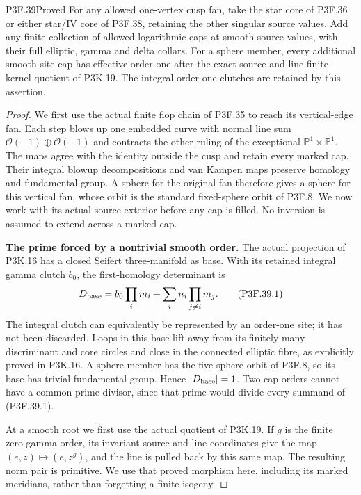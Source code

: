 \begin{statement}{P3F.39}{Proved}
For any allowed one-vertex cusp fan, take the star
core of P3F.36 or either star/IV core of P3F.38, retaining the other
singular source values. Add any finite collection of allowed
logarithmic caps at smooth source values, with their full elliptic,
gamma and delta collars. For a sphere member, every additional
smooth-site cap has effective order one after the exact
source-and-line finite-kernel quotient of P3K.19. The integral
order-one clutches are retained by this assertion.
\end{statement}

\begin{proof}
We first use the actual finite flop chain of P3F.35 to reach its
vertical-edge fan. Each step blows up one embedded curve with normal
line sum \(\mathcal O(-1)\oplus\mathcal O(-1)\) and contracts
the other ruling of the exceptional \(\mathbb P^1\times\mathbb P^1\).
The maps agree with the identity outside the cusp and retain every
marked cap. Their integral blowup decompositions and van Kampen
maps preserve homology and fundamental group. A sphere for the
original fan therefore gives a sphere for this vertical fan, whose
orbit is the standard fixed-sphere orbit of P3F.8. We now work with
its actual source exterior before any cap is filled. No inversion
is assumed to extend across a marked cap.

\par\medskip\noindent\textbf{The prime forced by a nontrivial smooth order.}
The actual projection of P3K.16 has a closed Seifert three-manifold
as base. With its retained integral gamma clutch \(b_0\), the
first-homology determinant is
\[
 D_{\rm base}=b_0\prod_i m_i+
                         \sum_i n_i\prod_{j\ne i}m_j.        \tag{P3F.39.1}
\]
The integral clutch can equivalently be represented by an order-one
site; it has not been discarded. Loops in this base lift away from
its finitely many discriminant and core circles and close in the
connected elliptic fibre, as explicitly proved in P3K.16. A sphere
member has the five-sphere orbit of P3F.8, so its base has trivial
fundamental group. Hence \(|D_{\rm base}|=1\). Two cap orders
cannot have a common prime divisor, since that prime would divide
every summand of (P3F.39.1).

At a smooth root we first use the actual quotient of P3K.19. If
\(g\) is the finite zero-gamma order, its invariant source-and-line
coordinates give the map \((e,z)\mapsto(e,z^g)\), and the line
is pulled back by this same map. The resulting norm pair is
primitive. We use that proved morphism here, including its marked
meridians, rather than forgetting a finite isogeny.


\end{proof}
